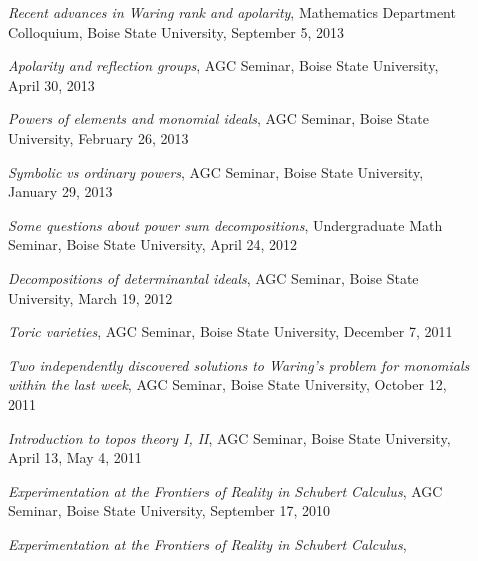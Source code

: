 \documentclass[12pt]{article}
\begin{document}
\begin{description}
\item[] \textit{Recent advances in Waring rank and apolarity},
Mathematics Department Colloquium, Boise State University, September 5, 2013
\item[] \textit{Apolarity and reflection groups},
AGC Seminar, Boise State University, April 30, 2013
\item[] \textit{Powers of elements and monomial ideals},
AGC Seminar, Boise State University, February 26, 2013
\item[] \textit{Symbolic vs ordinary powers},
AGC Seminar, Boise State University, January 29, 2013
\item[] \textit{Some questions about power sum decompositions},
Undergraduate Math Seminar, Boise State University, April 24, 2012
\item[] \textit{Decompositions of determinantal ideals},
AGC Seminar, Boise State University, March 19, 2012
\item[] \textit{Toric varieties},
AGC Seminar, Boise State University, December 7, 2011
\item[] \textit{Two independently discovered solutions to Waring's problem for monomials within the last week},
AGC Seminar, Boise State University, October 12, 2011
\item[] \textit{Introduction to topos theory I, II},
AGC Seminar, Boise State University, April 13, May 4, 2011
\item[] \textit{Experimentation at the Frontiers of Reality in Schubert Calculus},
AGC Seminar, Boise State University, September 17, 2010
\item[] \textit{Experimentation at the Frontiers of Reality in Schubert Calculus},

\end{description}
\end{document}
